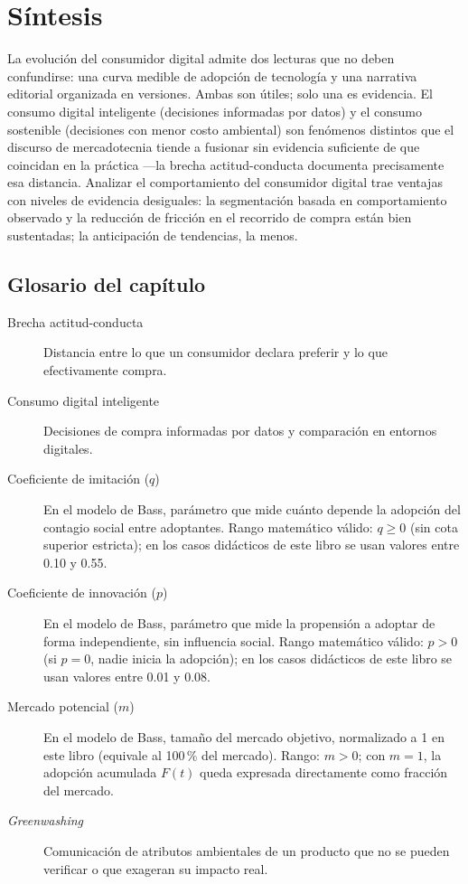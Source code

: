 \section{Síntesis}

La evolución del consumidor digital admite dos lecturas que no deben
confundirse: una curva medible de adopción de tecnología y una narrativa
editorial organizada en versiones. Ambas son útiles; solo una es evidencia.
El consumo digital inteligente (decisiones informadas por datos) y el consumo
sostenible (decisiones con menor costo ambiental) son fenómenos distintos que
el discurso de mercadotecnia tiende a fusionar sin evidencia suficiente de
que coincidan en la práctica —la brecha actitud-conducta documenta
precisamente esa distancia. Analizar el comportamiento del consumidor digital
trae ventajas con niveles de evidencia desiguales: la segmentación basada en
comportamiento observado y la reducción de fricción en el recorrido de compra
están bien sustentadas; la anticipación de tendencias, la menos.

\subsection*{Glosario del capítulo}
\begin{description}
  \item[Brecha actitud-conducta] Distancia entre lo que un consumidor declara
  preferir y lo que efectivamente compra.
  \item[Consumo digital inteligente] Decisiones de compra informadas por
  datos y comparación en entornos digitales.
  \item[Coeficiente de imitación ($q$)] En el modelo de Bass, parámetro que
  mide cuánto depende la adopción del contagio social entre adoptantes.
  Rango matemático válido: $q \geq 0$ (sin cota superior estricta); en los
  casos didácticos de este libro se usan valores entre 0.10 y 0.55.
  \item[Coeficiente de innovación ($p$)] En el modelo de Bass, parámetro que
  mide la propensión a adoptar de forma independiente, sin influencia social.
  Rango matemático válido: $p > 0$ (si $p=0$, nadie inicia la adopción); en
  los casos didácticos de este libro se usan valores entre 0.01 y 0.08.
  \item[Mercado potencial ($m$)] En el modelo de Bass, tamaño del mercado
  objetivo, normalizado a 1 en este libro (equivale al 100\,\% del mercado).
  Rango: $m > 0$; con $m=1$, la adopción acumulada $F(t)$ queda expresada
  directamente como fracción del mercado.
  \item[\textit{Greenwashing}] Comunicación de atributos ambientales de un
  producto que no se pueden verificar o que exageran su impacto real.
\end{description}

